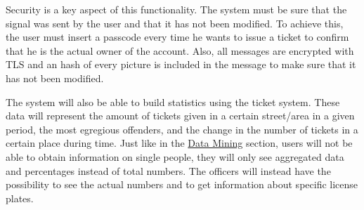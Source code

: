 Security is a key aspect of this functionality. The system must be sure that the signal was sent by the user and that it has not been modified.
To achieve this, the user must insert a passcode every time he wants to issue a ticket to confirm that he is the actual owner of the account.
Also, all messages are encrypted with TLS and an hash of every picture is included in the message to make sure that it has not been modified.

The system will also be able to build statistics using the ticket system.
These data will represent the amount of tickets given in a certain street/area in a given period, the most egregious offenders, and the change in the number of tickets in a certain place during time.
Just like in the
\hyperref[sec:data_mining]{Data Mining}
section, users will not be able to obtain information on single people, they will only see aggregated data and percentages instead of total numbers.
The officers will instead have the possibility to see the actual numbers and to get information about specific license plates.